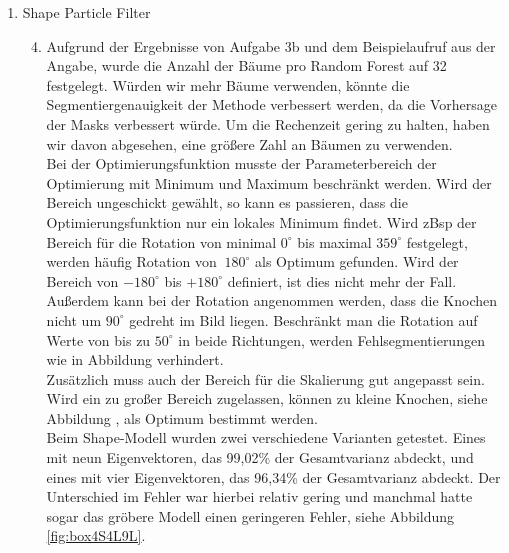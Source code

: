\documentclass[]{report}
\begin{document}
\begin{enumerate}
		\item Shape Particle Filter
			\begin{enumerate}
				\setcounter{enumii}{3}
				\item
				Aufgrund der Ergebnisse von Aufgabe 3b und dem Beispielaufruf aus der Angabe, wurde die Anzahl der Bäume pro Random Forest auf 32 festgelegt. Würden wir mehr Bäume verwenden, könnte die Segmentiergenauigkeit der Methode verbessert werden, da die Vorhersage der Masks verbessert würde. Um die Rechenzeit gering zu halten, haben wir davon abgesehen, eine größere Zahl an Bäumen zu verwenden.\\
				Bei der Optimierungsfunktion musste der Parameterbereich der Optimierung mit Minimum und Maximum beschränkt werden. Wird der Bereich ungeschickt gewählt, so kann es passieren, dass die Optimierungsfunktion nur ein lokales Minimum findet. Wird zBsp der Bereich für die Rotation von minimal $0^\circ$ bis maximal $359^\circ$ festgelegt, werden häufig Rotation von $~180^\circ$ als Optimum gefunden. %
				Wird der Bereich von $-180^\circ$ bis $+180^\circ$ definiert, ist dies nicht mehr der Fall.\\
				Außerdem kann bei der Rotation angenommen werden, dass die Knochen nicht um $90^\circ$ gedreht im Bild liegen. Beschränkt man die Rotation auf Werte von bis zu $50^\circ$ in beide Richtungen, werden Fehlsegmentierungen %
				wie in Abbildung %
				verhindert.\\
				Zusätzlich muss auch der Bereich für die Skalierung gut angepasst sein. Wird ein zu großer Bereich zugelassen, können zu kleine Knochen, siehe Abbildung %
				, als Optimum bestimmt werden.\\
				Beim Shape-Modell wurden zwei verschiedene Varianten getestet. Eines mit neun Eigenvektoren, das 99,02\% der Gesamtvarianz abdeckt, und eines mit vier Eigenvektoren, das 96,34\% der Gesamtvarianz abdeckt. Der Unterschied im Fehler war hierbei relativ gering und manchmal hatte sogar das gröbere Modell einen geringeren Fehler, siehe Abbildung \ref{fig:box4S4L9L}.\\ 
				\begin{figure}
					\centering

\end{figure}
\end{enumerate}
\end{enumerate}
\end{document}
